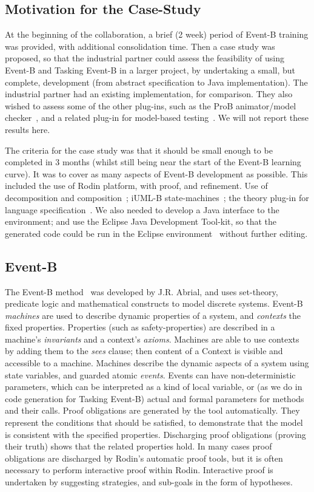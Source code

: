 \documentclass{llncs}%
\begin{document}
\subsection{Motivation for the Case-Study}
At the beginning of the collaboration, a brief (2 week) period of Event-B training was provided, with additional consolidation time. Then a case study was proposed, so that the industrial partner could assess the feasibility of using Event-B and Tasking Event-B in a larger project, by undertaking a small, but complete, development (from abstract specification to Java implementation). The industrial partner had an existing implementation, for comparison. They also wished to assess some of the other plug-ins, such as the ProB animator/model checker~\cite{ProB}, and a related plug-in for model-based testing~\cite{DBLP:conf/asm/DincaIMS12}. We will not report these results here. 

The criteria for the case study was that it should be small enough to be completed in 3 months (whilst still being near the start of the Event-B learning curve). It was to cover as many aspects of Event-B development as possible. This included the use of Rodin platform, with proof, and refinement. Use of decomposition and composition~\cite{decomp2010c}; iUML-B state-machines~\cite{snookIUMLB}; the theory plug-in for language specification~\cite{ecs18269}. We also needed to develop a Java interface to the environment; and use the Eclipse Java Development Tool-kit, so that the generated code could be run in the Eclipse environment~\cite{EclipseOrg} without further editing. 
%
%
\subsection{Event-B}
%
The Event-B method~\cite{ABR10} was developed by J.R. Abrial, and uses set-theory, predicate logic and mathematical constructs to model discrete systems. Event-B \emph{machines} are used to describe dynamic properties of a system, and \emph{contexts} the fixed properties. Properties (such as safety-properties) are described in a machine's \emph{invariants} and a context's \emph{axioms}.  Machines are able to use contexts by adding them to the \emph{sees} clause; then content of a Context is visible and accessible to a machine. Machines describe the dynamic aspects of a system using state variables, and guarded atomic \emph{events}. Events can have non-deterministic parameters, which can be interpreted as a kind of local variable, or (as we do in code generation for Tasking Event-B) actual and formal parameters for methods and their calls. Proof obligations are generated by the tool automatically. They represent the conditions that should be satisfied, to demonstrate that the model is consistent with the specified properties. Discharging proof obligations (proving their truth) shows that the related properties hold. In many cases proof obligations are discharged by Rodin's automatic proof tools, but it is often necessary to perform interactive proof within Rodin. Interactive proof is undertaken by suggesting strategies, and sub-goals in the form of hypotheses. 
\end{document}
